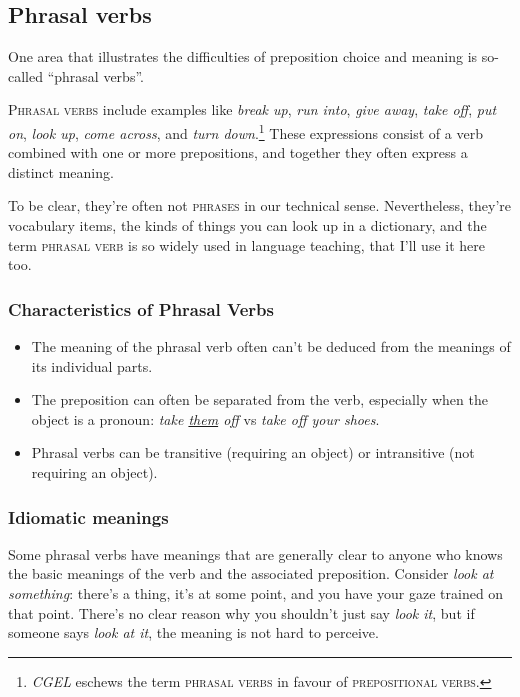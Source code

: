 \subsection{Phrasal verbs}\label{ssec:phrasal-verbs}

One area that illustrates the difficulties of preposition choice and meaning is so-called ``phrasal verbs''.

\textsc{Phrasal verbs} include examples like \textit{break up}, \textit{run into}, \textit{give away}, \textit{take off},
\textit{put on}, \textit{look up}, \textit{come across}, and \textit{turn down}.\footnote{\textit{CGEL} \citep{Huddleston2002} eschews the term \textsc{phrasal verbs} in favour of \textsc{prepositional verbs}.} These expressions consist of a verb
combined with one or more prepositions, and together they often express a distinct meaning.

To be clear, they're often not \textsc{phrases} in our technical sense. Nevertheless,
they're vocabulary items, the kinds of things you can look up in a dictionary,
and the term \textsc{phrasal verb} is so widely used in language teaching, that I'll use
it here too.

\subsubsection*{Characteristics of Phrasal Verbs}

\begin{itemize}
    \item The meaning of the phrasal verb often can't be deduced from the meanings
    of its individual parts.
    \item The preposition can often be separated from the verb, especially when the
    object is a pronoun: \textit{take \uline{them} off} vs \textit{take off your shoes}.
    \item Phrasal verbs can be transitive (requiring an object) or intransitive (not
    requiring an object).
\end{itemize}

\subsubsection*{Idiomatic meanings}
Some phrasal verbs have meanings that are generally clear to anyone who knows
the basic meanings of the verb and the associated preposition. Consider \textit{look at
something}: there's a thing, it's at some point, and you have your gaze trained
on that point. There's no clear reason why you shouldn't just say \textit{look it}, but if
someone says \textit{look at it}, the meaning is not hard to perceive. 

